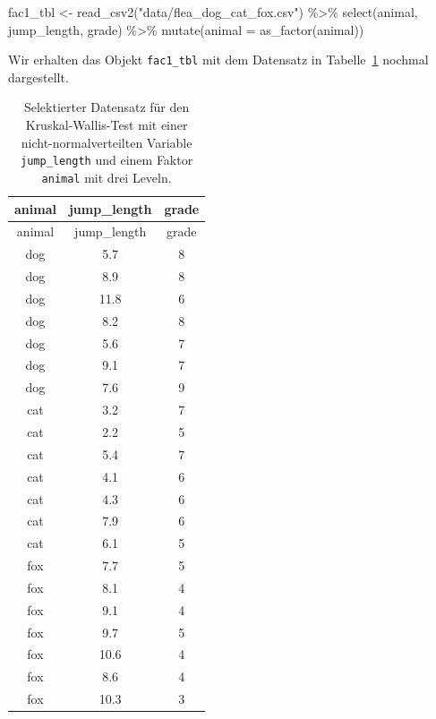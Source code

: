 \documentclass[
  letterpaper,
  DIV=11,
  oneside]{scrreport}
\newenvironment{Shaded}{\begin{snugshade}}{\end{snugshade}}
\newcommand{\AttributeTok}[1]{\textcolor[rgb]{0.40,0.45,0.13}{#1}}
\newcommand{\FunctionTok}[1]{\textcolor[rgb]{0.28,0.35,0.67}{#1}}
\newcommand{\NormalTok}[1]{\textcolor[rgb]{0.00,0.23,0.31}{#1}}
\newcommand{\OtherTok}[1]{\textcolor[rgb]{0.00,0.23,0.31}{#1}}
\newcommand{\SpecialCharTok}[1]{\textcolor[rgb]{0.37,0.37,0.37}{#1}}
\newcommand{\StringTok}[1]{\textcolor[rgb]{0.13,0.47,0.30}{#1}}
\begin{document}
\begin{Shaded}
\begin{Highlighting}[]
\NormalTok{fac1\_tbl }\OtherTok{\textless{}{-}} \FunctionTok{read\_csv2}\NormalTok{(}\StringTok{"data/flea\_dog\_cat\_fox.csv"}\NormalTok{) }\SpecialCharTok{\%\textgreater{}\%}
  \FunctionTok{select}\NormalTok{(animal, jump\_length, grade) }\SpecialCharTok{\%\textgreater{}\%} 
  \FunctionTok{mutate}\NormalTok{(}\AttributeTok{animal =} \FunctionTok{as\_factor}\NormalTok{(animal))}
\end{Highlighting}
\end{Shaded}

Wir erhalten das Objekt \texttt{fac1\_tbl} mit dem Datensatz in
Tabelle~\ref{tbl-data-kruskal-1} nochmal dargestellt.

\hypertarget{tbl-data-kruskal-1}{}
\begin{longtable}[]{@{}ccc@{}}
\caption{\label{tbl-data-kruskal-1}Selektierter Datensatz für den
Kruskal-Wallis-Test mit einer nicht-normalverteilten Variable
\texttt{jump\_length} und einem Faktor \texttt{animal} mit drei
Leveln.}\tabularnewline
\toprule()
animal & jump\_length & grade \\
\midrule()
\endfirsthead
\toprule()
animal & jump\_length & grade \\
\midrule()
\endhead
dog & 5.7 & 8 \\
dog & 8.9 & 8 \\
dog & 11.8 & 6 \\
dog & 8.2 & 8 \\
dog & 5.6 & 7 \\
dog & 9.1 & 7 \\
dog & 7.6 & 9 \\
cat & 3.2 & 7 \\
cat & 2.2 & 5 \\
cat & 5.4 & 7 \\
cat & 4.1 & 6 \\
cat & 4.3 & 6 \\
cat & 7.9 & 6 \\
cat & 6.1 & 5 \\
fox & 7.7 & 5 \\
fox & 8.1 & 4 \\
fox & 9.1 & 4 \\
fox & 9.7 & 5 \\
fox & 10.6 & 4 \\
fox & 8.6 & 4 \\
fox & 10.3 & 3 \\
\bottomrule()
\end{longtable}
\end{document}
